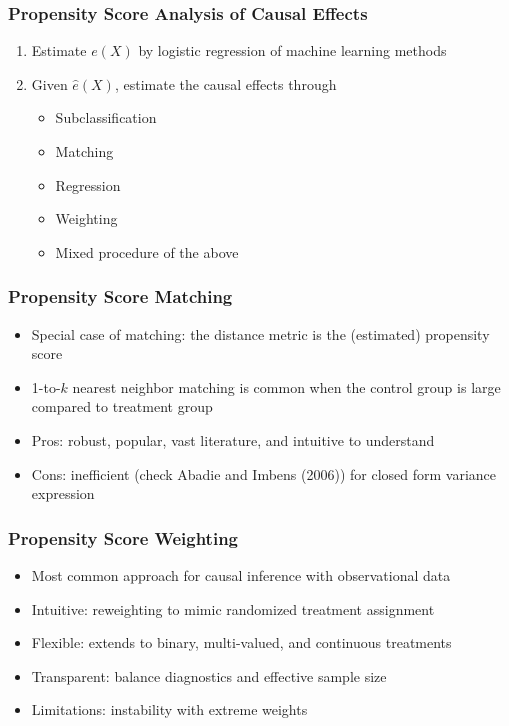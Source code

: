 \documentclass[10pt, handout]{beamer}
\begin{document}
    \begin{frame}
      \frametitle{Propensity Score Analysis of Causal Effects}
      
      \begin{enumerate}
        \item Estimate $e(X)$ by logistic regression of machine learning methods
        \item Given $\hat{e}(X)$, estimate the causal effects through
        \begin{itemize}
          \item Subclassification
          \item Matching
          \item Regression
          \item Weighting
          \item Mixed procedure of the above
        \end{itemize}
      \end{enumerate}
      

    \end{frame}
    


    \begin{frame}
      \frametitle{Propensity Score Matching}

      \begin{itemize}
        \item Special case of matching: the distance metric is the (estimated) propensity score
        \item 1-to-$k$ nearest neighbor matching is common when the control group is large compared to treatment group
        \item Pros: robust, popular, vast literature, and intuitive to understand
        \item Cons: inefficient (check Abadie and Imbens (2006)) for closed form variance expression
      \end{itemize}

    \end{frame}


    \begin{frame}
      \frametitle{Propensity Score Weighting}

      \begin{itemize}
        \item Most common approach for causal inference with observational data
        \item Intuitive: reweighting to mimic randomized treatment assignment
        \item Flexible: extends to binary, multi-valued, and continuous treatments
        \item Transparent: balance diagnostics and effective sample size
        \item Limitations: instability with extreme weights
      \end{itemize}
    \end{frame}
  
\end{document}
